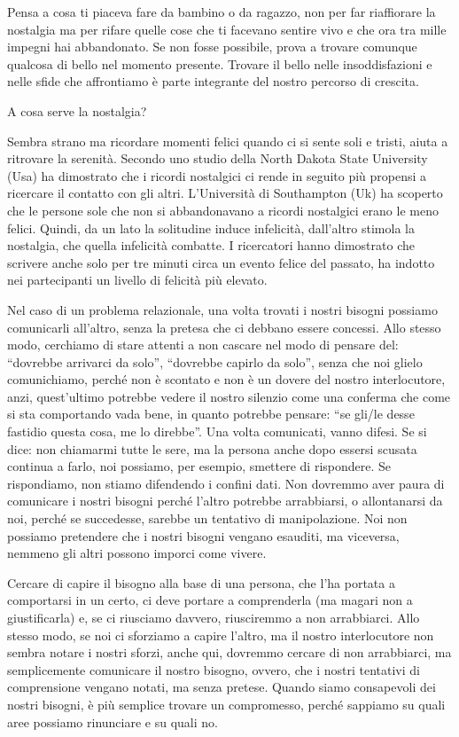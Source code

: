 \documentclass[12pt]{book} %
\begin{document}
Pensa a cosa ti piaceva fare da bambino o da ragazzo, non per far riaffiorare la nostalgia ma per rifare quelle cose che
ti facevano sentire vivo e che ora tra mille impegni hai abbandonato. Se non fosse possibile, prova a trovare comunque
qualcosa di bello nel momento presente. Trovare il bello nelle insoddisfazioni e nelle sfide che affrontiamo è parte
integrante del nostro percorso di crescita.

\begin{mdframed}[linewidth=1pt]
A cosa serve la nostalgia?

Sembra strano ma ricordare momenti felici quando ci si sente soli e tristi, aiuta a ritrovare la serenità. Secondo uno
studio della North Dakota State University (Usa) ha dimostrato che i ricordi nostalgici ci rende in seguito più
propensi a ricercare il contatto con gli altri. L'Università di Southampton (Uk) ha scoperto che le persone sole che
non si abbandonavano a ricordi nostalgici erano le meno felici. Quindi, da un lato la solitudine induce infelicità,
dall'altro stimola la nostalgia, che quella infelicità combatte. I ricercatori hanno dimostrato che scrivere anche solo
per tre minuti circa un evento felice del passato, ha indotto nei partecipanti un livello di felicità più elevato.
\end{mdframed}

Nel caso di un problema relazionale, una volta trovati i nostri bisogni possiamo comunicarli all'altro, senza la pretesa che ci debbano essere concessi.
Allo stesso modo, cerchiamo di stare attenti a non cascare nel modo di pensare del: “dovrebbe arrivarci da solo”, “dovrebbe capirlo da solo”, senza che noi glielo comunichiamo, perché non è scontato e non è un dovere del nostro interlocutore, anzi, quest'ultimo potrebbe vedere il nostro silenzio come una
conferma che come si sta comportando vada bene, in quanto potrebbe pensare: “se gli/le desse fastidio questa cosa, me
lo direbbe”. Una volta comunicati, vanno difesi. Se si dice: non chiamarmi tutte le sere, ma la persona anche dopo
essersi scusata continua a farlo, noi possiamo, per esempio, smettere di rispondere. Se rispondiamo, non stiamo
difendendo i confini dati. Non dovremmo aver paura di comunicare i nostri bisogni perché l'altro
potrebbe arrabbiarsi, o allontanarsi da noi, perché se succedesse, sarebbe un tentativo di manipolazione. Noi non
possiamo pretendere che i nostri bisogni vengano esauditi, ma viceversa, nemmeno gli altri possono imporci come vivere. 

Cercare di capire il bisogno alla base di una persona, che l'ha portata a comportarsi in un certo,
ci deve portare a comprenderla (ma magari non a giustificarla) e, se ci riusciamo davvero, riusciremmo a non
arrabbiarci. Allo stesso modo, se noi ci sforziamo a capire l'altro, ma il nostro interlocutore non sembra notare i
nostri sforzi, anche qui, dovremmo cercare di non arrabbiarci, ma semplicemente comunicare il nostro bisogno, ovvero,
che i nostri tentativi di comprensione vengano notati, ma senza pretese. Quando siamo consapevoli dei nostri bisogni, è più semplice
trovare un compromesso, perché sappiamo su quali aree possiamo rinunciare e su quali no.
\end{document}
